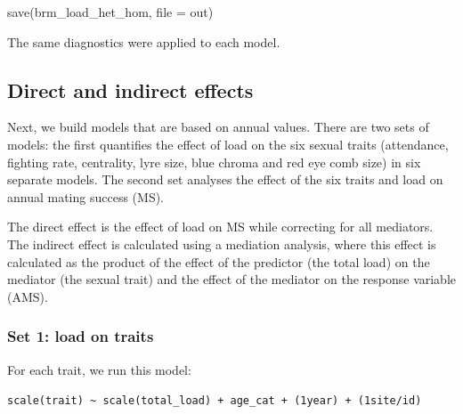 \documentclass[
  letterpaper,
  DIV=11,
  numbers=noendperiod]{scrreprt}
\newenvironment{Shaded}{}{}
\newcommand{\AttributeTok}[1]{\textcolor[rgb]{0.84,0.23,0.29}{#1}}
\newcommand{\FunctionTok}[1]{\textcolor[rgb]{0.44,0.26,0.76}{#1}}
\newcommand{\NormalTok}[1]{\textcolor[rgb]{0.14,0.16,0.18}{#1}}
\begin{document}
\begin{Shaded}
\begin{Highlighting}[]
\FunctionTok{save}\NormalTok{(brm\_load\_het\_hom, }\AttributeTok{file =}\NormalTok{ out)}
\end{Highlighting}
\end{Shaded}

The same diagnostics were applied to each model.

\subsection{Direct and indirect
effects}\label{direct-and-indirect-effects}

Next, we build models that are based on annual values. There are two
sets of models: the first quantifies the effect of load on the six
sexual traits (attendance, fighting rate, centrality, lyre size, blue
chroma and red eye comb size) in six separate models. The second set
analyses the effect of the six traits and load on annual mating success
(MS).

The direct effect is the effect of load on MS while correcting for all
mediators. The indirect effect is calculated using a mediation analysis,
where this effect is calculated as the product of the effect of the
predictor (the total load) on the mediator (the sexual trait) and the
effect of the mediator on the response variable (AMS).

\subsubsection{Set 1: load on traits}\label{set-1-load-on-traits}

For each trait, we run this model:

\texttt{scale(trait)\ \textasciitilde{}\ scale(total\_load)\ +\ age\_cat\ +\ (1\textbar{}year)\ +\ (1\textbar{}site/id)}
\end{document}
